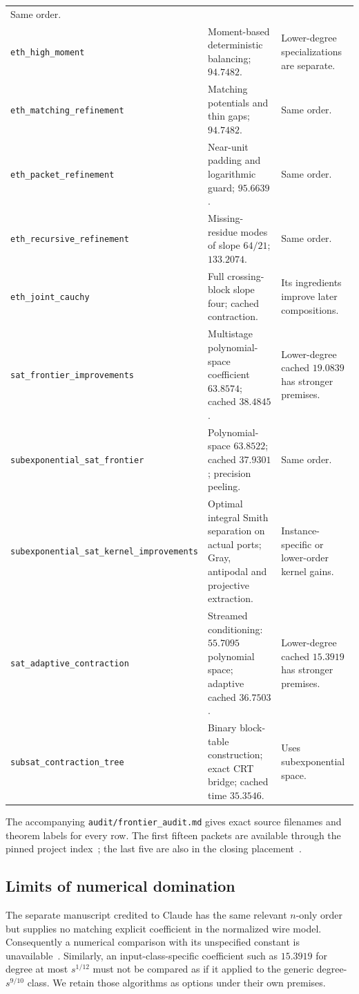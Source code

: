 \begin{longtable}{@{}>{\raggedright\arraybackslash}p{}>{\raggedright\arraybackslash}p{}>{\raggedright\arraybackslash}p{}@{}}
Same order.\\[4pt]
\nolinkurl{eth_high_moment} &
Moment-based deterministic balancing; $94.7482$. &
Lower-degree specializations are separate.\\[4pt]
\nolinkurl{eth_matching_refinement} &
Matching potentials and thin gaps; $94.7482$. &
Same order.\\[4pt]
\nolinkurl{eth_packet_refinement} &
Near-unit padding and logarithmic guard; $95.6639$. &
Same order.\\[4pt]
\nolinkurl{eth_recursive_refinement} &
Missing-residue modes of slope $64/21$; $133.2074$. &
Same order.\\[4pt]
\nolinkurl{eth_joint_cauchy} &
Full crossing-block slope four; cached contraction. &
Its ingredients improve later compositions.\\[4pt]
\nolinkurl{sat_frontier_improvements} &
Multistage polynomial-space coefficient $63.8574$;
cached $38.4845$. &
Lower-degree cached $19.0839$ has stronger premises.\\[4pt]
\nolinkurl{subexponential_sat_frontier} &
Polynomial-space $63.8522$; cached $37.9301$;
precision peeling. &
Same order.\\[4pt]
\nolinkurl{subexponential_sat_kernel_improvements} &
Optimal integral Smith separation on actual ports;
Gray, antipodal and projective extraction. &
Instance-specific or lower-order kernel gains.\\[4pt]
\nolinkurl{sat_adaptive_contraction} &
Streamed conditioning: $55.7095$ polynomial space; adaptive cached $36.7503$. &
Lower-degree cached $15.3919$ has stronger premises.\\[4pt]
\nolinkurl{subsat_contraction_tree} &
Binary block-table construction; exact CRT bridge;
cached time $35.3546$. &
Uses subexponential space.\\
\bottomrule
\end{longtable}
\normalsize

The accompanying \nolinkurl{audit/frontier_audit.md} gives exact source
filenames and theorem labels for every row. The first fifteen packets
are available through the pinned project index~\cite{index}; the last
five are also in the closing placement~\cite{satfrontier,frontier,kernel,tree,adaptive}.

\subsection{Limits of numerical domination}
The separate manuscript credited to Claude has the same relevant
$n$-only order but supplies no matching explicit coefficient in the
normalized wire model. Consequently a numerical comparison with its
unspecified constant is unavailable~\cite{claude}. Similarly, an input-class-specific
coefficient such as $15.3919$ for degree at most $s^{1/12}$ must not be
compared as if it applied to the generic degree-$s^{9/10}$ class.
We retain those algorithms as options under their own premises.

